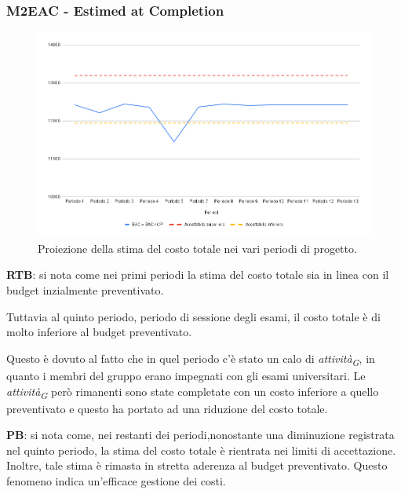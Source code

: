 \subsubsection{M2EAC - Estimed at Completion}

\vspace{0.3cm}

\begin{figure}[H]
    \centering
    \includegraphics[width=1\textwidth]{../Images/PianoDiQualifica/M2EAC.png}
    \caption{Proiezione della stima del costo totale nei vari periodi di progetto.}
    \label{fig:2}
\end{figure}

\vspace{0.2cm}

\textbf{RTB}: si nota come nei primi periodi la stima del costo totale sia in linea con il budget inzialmente preventivato.

Tuttavia al quinto periodo, periodo di sessione degli esami, il costo totale è di molto inferiore al budget preventivato.

Questo è dovuto al fatto che in quel periodo c'è stato un calo di \textit{attività}\textsubscript{\textit{G}}, in quanto i membri del gruppo erano impegnati con gli esami universitari. Le \textit{attività}\textsubscript{\textit{G}} però rimanenti sono state completate con un costo inferiore a quello preventivato e questo ha portato ad una riduzione del costo totale.\\
\vspace{0.2cm}

\textbf{PB}: si nota come, nei restanti dei periodi,nonostante una diminuzione registrata nel quinto periodo, la stima del costo totale è rientrata nei limiti di accettazione. Inoltre, tale stima è rimasta in stretta aderenza al budget preventivato. Questo fenomeno indica un’efficace gestione dei costi.


